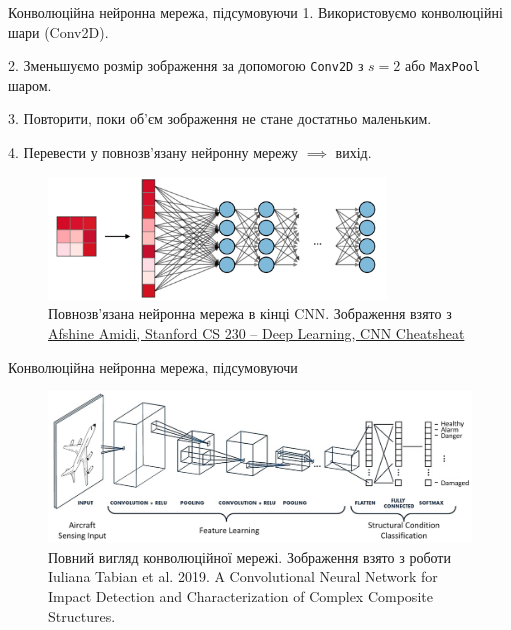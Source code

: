 \documentclass{zkdl-presentation-template}
\begin{document}
    \begin{frame}{Конволюційна нейронна мережа, підсумовуючи}
        1. Використовуємо конволюційні шари (\textsf{Conv2D}).
        
        2. Зменьшуємо розмір зображення за допомогою \texttt{Conv2D} з $s=2$ або \texttt{MaxPool} шаром.
        
        3. Повторити, поки об'єм зображення не стане достатньо маленьким.

        4. Перевести у повнозв'язану нейронну мережу $\implies$ вихід.

        \begin{figure}
        \centering
            \includegraphics[width=0.8\textwidth]{images/cnn.png}
            \caption{Повнозв'язана нейронна мережа в кінці CNN. \scriptsize Зображення взято з \href{https://stanford.edu/~shervine/teaching/cs-230/cheatsheet-convolutional-neural-networks}{Afshine Amidi, Stanford CS 230 -- Deep Learning, CNN Cheatsheat}}
        \end{figure}
    \end{frame}

    \begin{frame}{Конволюційна нейронна мережа, підсумовуючи}
        \begin{figure}
        \centering
            \includegraphics[width=\textwidth]{images/cnn_full.png}
            \caption{Повний вигляд конволюційної мережі.  \scriptsize Зображення взято з роботи Iuliana Tabian et al. 2019. A Convolutional Neural Network for Impact Detection and Characterization of Complex Composite Structures.}
        \end{figure}
    \end{frame}
\end{document}
